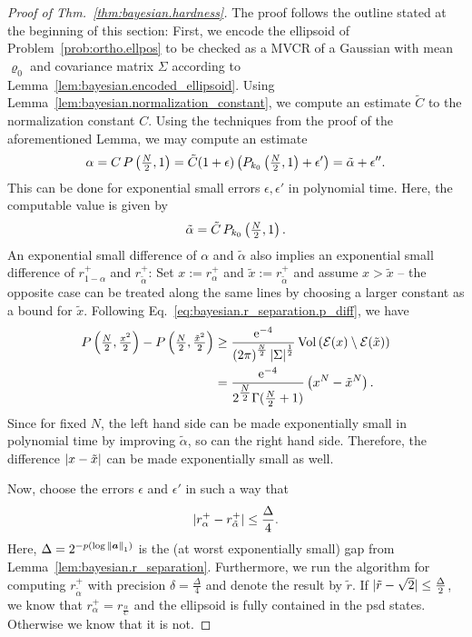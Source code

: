 \begin{proof}[Proof of Thm.~\ref{thm:bayesian.hardness}]
  The proof follows the outline stated at the beginning of this section:
  First, we encode the ellipsoid of Problem~\ref{prob:ortho.ellpos} to be checked as a MVCR of a Gaussian with mean $\varrho_0$ and covariance matrix $\Sigma$ according to Lemma~\ref{lem:bayesian.encoded_ellipsoid}.
  Using Lemma~\ref{lem:bayesian.normalization_constant}, we compute an estimate $\tilde C$ to the normalization constant $C$.
  Using the techniques from the proof of the aforementioned Lemma, we may compute an estimate
  \begin{equation}
    \alpha = C \, P\left( \tfrac{N}{2}, 1 \right) = \tilde C (1 + \epsilon) \left( P_{k_0}\left( \tfrac{N}{2}, 1 \right) + \epsilon' \right) = \tilde\alpha + \epsilon''.
  \end{equation}
  This can be done for exponential small errors $\epsilon, \epsilon'$ in polynomial time.
  Here, the computable value is given by
  \begin{equation}
    \tilde\alpha = \tilde C \, P_{k_0}\left(\tfrac{N}{2}, 1 \right).
  \end{equation}
  An exponential small difference of $\alpha$ and $\tilde\alpha$ also implies an exponential small difference of $r^+_{1-\alpha}$ and $r^+_{\tilde\alpha}$:
  Set $x := r^+_{\alpha}$ and $\tilde x := r^+_{\tilde\alpha}$ and assume $x > \tilde x$ -- the opposite case can be treated along the same lines by choosing a larger constant as a bound for $\tilde x$.
  Following Eq.~\eqref{eq:bayesian.r_separation.p_diff}, we have
  \begin{align*}
    P\left( \tfrac{N}{2}, \tfrac{x^2}{2} \right) - P\left( \tfrac{N}{2}, \tfrac{{\tilde x}^2}{2} \right)
    &\ge \frac{\mathrm{e}^{-4}}{{(2\pi)}^{\frac{N}{2}} \, {\vert\Sigma\vert}^{\frac{1}{2}}} \, \mathrm{Vol}\left(  \mathcal{E}(x) \setminus \mathcal{E}(\tilde x)  \right) \\
    &= \frac{\mathrm{e}^{-4}}{2^{\tfrac{N}{2}} \Gamma(\tfrac{N}{2} + 1)} \left( x^N - {\tilde x}^N \right).
  \end{align*}
  Since for fixed $N$, the left hand side can be made exponentially small in polynomial time by improving $\tilde\alpha$, so can the right hand side.
  Therefore, the difference ${\vert x - \tilde x\vert}$ can be made exponentially small as well.


  Now, choose the errors $\epsilon$ and $\epsilon'$ in such a way that
  \begin{equation}
    {\vert r^+_{\alpha} - r^+_{\tilde\alpha}\vert} \le \frac{\Delta}{4}.
  \end{equation}
  Here, $\Delta = 2^{-p(\log {\Vert{\boldsymbol{a}}\Vert}_1)}$ is the (at worst exponentially small) gap from Lemma~\ref{lem:bayesian.r_separation}.
  Furthermore, we run the algorithm for computing $r^+_{\tilde\alpha}$ with precision $\delta = \frac{\Delta}{4}$ and denote the result by $\tilde r$.
  If ${\vert\tilde r - \sqrt{2}\vert} \le \frac{\Delta}{2}$, we know that $r^+_{\alpha} = r_\frac{\alpha}{C}$ and the ellipsoid is fully contained in the psd states.
  Otherwise we know that it is not.
\end{proof}
